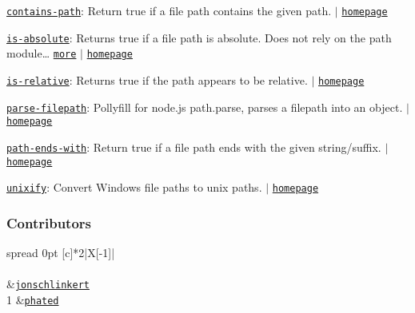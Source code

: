 \begin{DoxyItemize}
\item \href{https://www.npmjs.com/package/contains-path}{\tt contains-\/path}\+: Return true if a file path contains the given path. $\vert$ \href{https://github.com/jonschlinkert/contains-path}{\tt homepage}
\item \href{https://www.npmjs.com/package/is-absolute}{\tt is-\/absolute}\+: Returns true if a file path is absolute. Does not rely on the path module… \href{https://github.com/jonschlinkert/is-absolute}{\tt more} $\vert$ \href{https://github.com/jonschlinkert/is-absolute}{\tt homepage}
\item \href{https://www.npmjs.com/package/is-relative}{\tt is-\/relative}\+: Returns {\ttfamily true} if the path appears to be relative. $\vert$ \href{https://github.com/jonschlinkert/is-relative}{\tt homepage}
\item \href{https://www.npmjs.com/package/parse-filepath}{\tt parse-\/filepath}\+: Pollyfill for node.\+js {\ttfamily path.\+parse}, parses a filepath into an object. $\vert$ \href{https://github.com/jonschlinkert/parse-filepath}{\tt homepage}
\item \href{https://www.npmjs.com/package/path-ends-with}{\tt path-\/ends-\/with}\+: Return {\ttfamily true} if a file path ends with the given string/suffix. $\vert$ \href{https://github.com/jonschlinkert/path-ends-with}{\tt homepage}
\item \href{https://www.npmjs.com/package/unixify}{\tt unixify}\+: Convert Windows file paths to unix paths. $\vert$ \href{https://github.com/jonschlinkert/unixify}{\tt homepage}
\end{DoxyItemize}

\subsubsection*{Contributors}

\tabulinesep=1mm
\begin{longtabu} spread 0pt [c]{*{2}{|X[-1]}|}
\hline
\rowcolor{\tableheadbgcolor}\\
\endfirsthead
\hline
\endfoot
\hline
\rowcolor{\tableheadbgcolor}\\
  &\href{https://github.com/jonschlinkert}{\tt jonschlinkert}   \\
1  &\href{https://github.com/phated}{\tt phated}   \\
\end{longtabu}


